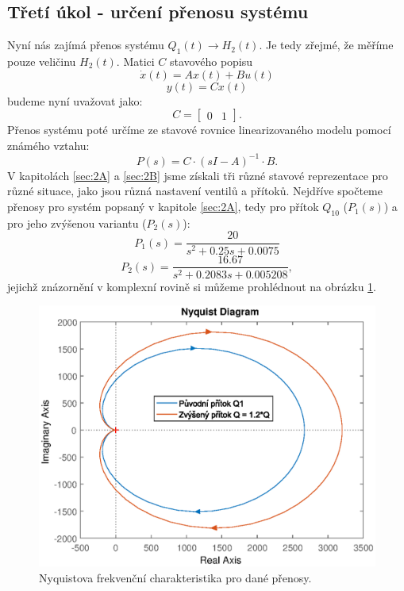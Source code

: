 \documentclass[a4paper,11pt]{article}
\begin{document}
\subsection{Třetí úkol - určení přenosu systému}\label{sec:3}
Nyní nás zajímá přenos systému $ Q_{1}\left ( t \right )\rightarrow H_{2}\left ( t \right ) $. Je tedy zřejmé, že měříme pouze veličinu $ H_{2}\left ( t \right ) $. Matici $ C $ stavového popisu
\begin{equation}
\dot{x}\left ( t \right )=Ax\left( t \right )+Bu \left( t \right)\end{equation}
\begin{equation}
y\left ( t \right )=Cx\left( t \right )
\end{equation}
budeme nyní uvažovat jako: $$C=\left [\begin{array}{cc}0 & 1\end{array}\right ].
$$
Přenos systému poté určíme ze stavové rovnice linearizovaného modelu pomocí známého vztahu:
\begin{equation}\label{eq:stav_popis} 
P\left ( s \right )=C\cdot \left ( sI-A \right )^{-1}\cdot B.
\end{equation}
V kapitolách \ref{sec:2A} a \ref{sec:2B} jsme získali tři různé stavové reprezentace pro různé situace, jako jsou různá nastavení ventilů a přítoků. Nejdříve spočteme přenosy pro systém popsaný v kapitole \ref{sec:2A}, tedy pro přítok $ Q_{10} $ ($ P_{1}\left ( s \right )  $) a pro jeho zvýšenou variantu ($ P_{2}\left ( s \right )  $):
\begin{equation}\label{eq:P-A1} 
P_{1}\left ( s \right ) =\frac{20}{s^{2} + 0.25 s + 0.0075}
\end{equation}
\begin{equation}\label{eq:P-A2} 
P_{2}\left ( s \right ) =\frac{16.67}{s^{2} + 0.2083  s + 0.005208},
\end{equation}
jejichž znázornění v komplexní rovině si můžeme prohlédnout na obrázku \ref{fig:nyquist-A}.
\begin{figure}[htbp]
	\begin{center}
	\includegraphics[scale = 1.0]{obrazky/nyquistA.eps}
	\end{center}
	\caption{Nyquistova frekvenční charakteristika pro dané přenosy.}
	\label{fig:nyquist-A}
\end{figure}
\end{document}
